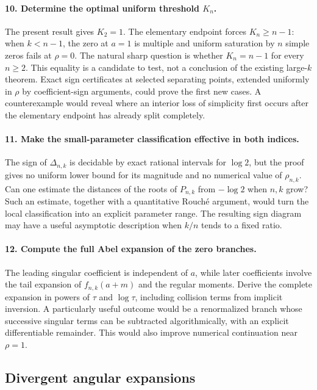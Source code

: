 \paragraph{10. Determine the optimal uniform threshold $K_n$.}
The present result gives $K_2=1$. The elementary endpoint forces
$K_n\geq n-1$: when $k<n-1$, the zero at $a=1$ is multiple and
uniform saturation by $n$ simple zeros fails at $\rho=0$.
The natural sharp question is whether $K_n=n-1$ for every $n\geq2$.
This equality is a candidate to test, not a conclusion of the existing
large-$k$ theorem. Exact sign certificates at selected separating
points, extended uniformly in $\rho$ by coefficient-sign arguments,
could prove the first new cases. A counterexample would reveal where
an interior loss of simplicity first occurs after the elementary
endpoint has already split completely.

\paragraph{11. Make the small-parameter classification effective in both indices.}
The sign of $\Delta_{n,k}$ is decidable by exact rational intervals
for $\log2$, but the proof gives no uniform lower bound for its
magnitude and no numerical value of $\rho_{n,k}$. Can one estimate
the distances of the roots of $P_{n,k}$ from $-\log2$ when $n,k$
grow? Such an estimate, together with a quantitative Rouché argument,
would turn the local classification into an explicit parameter range.
The resulting sign diagram may have a useful asymptotic description
when $k/n$ tends to a fixed ratio.

\paragraph{12. Compute the full Abel expansion of the zero branches.}
The leading singular coefficient is independent of $a$, while later
coefficients involve the tail expansion of $f_{n,k}(a+m)$ and the
regular moments. Derive the complete expansion in powers of $\tau$
and $\log\tau$, including collision terms from implicit inversion.
A particularly useful outcome would be a renormalized branch whose
successive singular terms can be subtracted algorithmically, with an
explicit differentiable remainder. This would also improve numerical
continuation near $\rho=1$.

\subsection{Divergent angular expansions}

